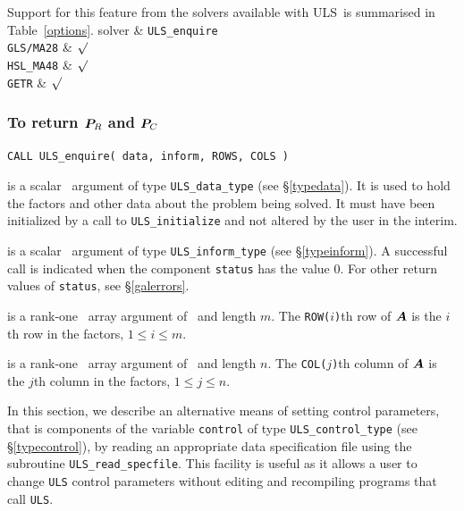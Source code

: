 \documentclass{galahad}
\newcommand{\packagename}{ULS}
\begin{document}
\newpage
Support for this feature from the solvers available with \packagename\
is summarised in Table~\ref{options}.
\hline
 solver & {\tt \packagename\_enquire} \\
\hline
{\tt GLS/MA28}  & $\surd$  \\
{\tt HSL\_MA48} & $\surd$  \\
{\tt GETR} & $\surd$  \\
\hline
{}
\vspace*{-8mm}
\subsubsection{To return ${\bm{P}}_R$ and ${\bm{P}}_C$}
\label{galenquire}

\hskip0.5in
{\tt CALL \packagename\_enquire( data, inform, ROWS, COLS )}

\begin{description}

 is a scalar \intentinout\ argument of type
{\tt \packagename\_data\_type}
(see \S\ref{typedata}). It is used to hold the factors and other
data about the problem being solved.
It must have been initialized by a call to
{\tt \packagename\_ini\-tialize} and not altered by the user in the interim.

 is a scalar \intentinout\ argument of type
{\tt \packagename\_inform\_type}
(see \S\ref{typeinform}).
A successful call is indicated when the  component {\tt status} has the value 0.
For other return values of {\tt status}, see \S\ref{galerrors}.

 is a rank-one \integer\ array argument
of \intentout\  and length $m$. The {\tt ROW($i$)}th row of ${\bm{A}}$
is the $i$th row in the factors, $1 \leq i \leq m$.

 is a rank-one \integer\ array argument
of \intentout\  and length $n$. The {\tt COL($j$)}th column of ${\bm{A}}$
is the $j$th column in the factors, $1 \leq j \leq n$.
\end{description}


\galcontrolfeatures
\noindent In this section, we describe an alternative means of setting
control parameters, that is components of the variable {\tt control} of type
{\tt \packagename\_control\_type}
(see \S\ref{typecontrol}),
by reading an appropriate data specification file using the
subroutine {\tt \packagename\_read\_specfile}. This facility
is useful as it allows a user to change  {\tt \packagename} control parameters
without editing and recompiling programs that call {\tt \packagename}.
\end{document}
